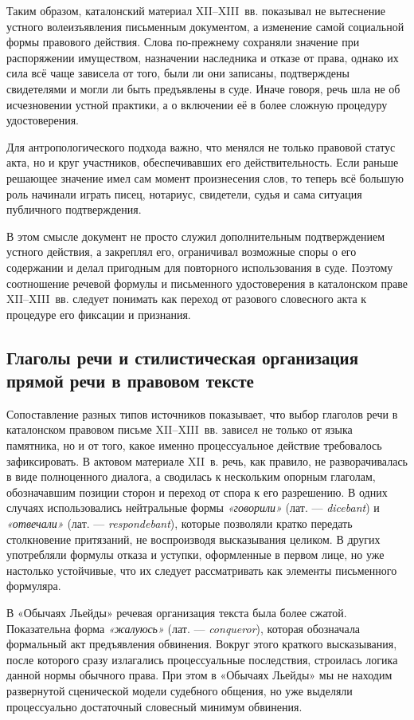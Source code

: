 Таким образом, каталонский материал XII--XIII~вв. показывал не вытеснение устного волеизъявления письменным документом, а изменение самой социальной формы правового действия. Слова по-прежнему сохраняли значение при распоряжении имуществом, назначении наследника и отказе от права, однако их сила всё чаще зависела от того, были ли они записаны, подтверждены свидетелями и могли ли быть предъявлены в суде. Иначе говоря, речь шла не об исчезновении устной практики, а о включении её в более сложную процедуру удостоверения.

Для антропологического подхода важно, что менялся не только правовой статус акта, но и круг участников, обеспечивавших его действительность. Если раньше решающее значение имел сам момент произнесения слов, то теперь всё большую роль начинали играть писец, нотариус, свидетели, судья и сама ситуация публичного подтверждения.

В этом смысле документ не просто служил дополнительным подтверждением устного действия, а закреплял его, ограничивал возможные споры о его содержании и делал пригодным для повторного использования в суде. Поэтому соотношение речевой формулы и письменного удостоверения в каталонском праве XII--XIII~вв. следует понимать как переход от разового словесного акта к процедуре его фиксации и признания.

\subsection{Глаголы речи и стилистическая организация прямой речи в правовом тексте}

Сопоставление разных типов источников показывает, что выбор глаголов речи в каталонском правовом письме XII--XIII~вв. зависел не только от языка памятника, но и от того, какое именно процессуальное действие требовалось зафиксировать. В актовом материале XII~в. речь, как правило, не разворачивалась в виде полноценного диалога, а сводилась к нескольким опорным глаголам, обозначавшим позиции сторон и переход от спора к его разрешению. В одних случаях использовались нейтральные формы \emph{«говорили»} (лат. --- \emph{dicebant}) и \emph{«отвечали» }(лат. --- \emph{respondebant}), которые позволяли кратко передать столкновение притязаний, не воспроизводя высказывания целиком. В других употребляли формулы отказа и уступки, оформленные в первом лице, но уже настолько устойчивые, что их следует рассматривать как элементы письменного формуляра.

В «Обычаях Льейды» речевая организация текста была более сжатой. Показательна форма \emph{«жалуюсь»} (лат. --- \emph{conqueror}), которая обозначала формальный акт предъявления обвинения. Вокруг этого краткого высказывания, после которого сразу излагались процессуальные последствия, строилась логика данной нормы обычного права. При этом в «Обычаях Льейды» мы не находим развернутой сценической модели судебного общения, но уже выделяли процессуально достаточный словесный минимум обвинения.

